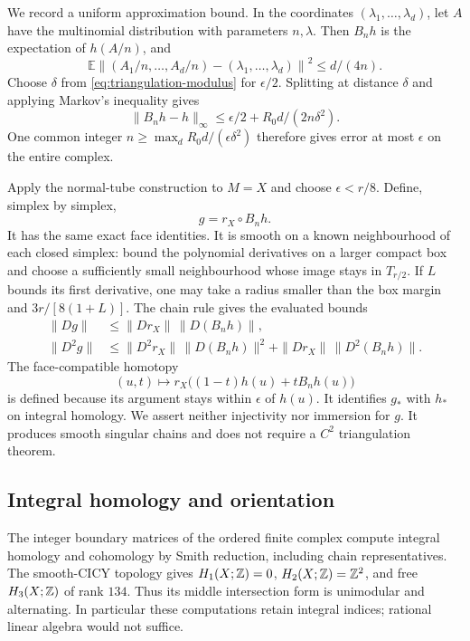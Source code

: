 We record a uniform approximation bound. In the coordinates
$(\lambda_1,\ldots,\lambda_d)$, let $A$ have the multinomial
distribution with parameters $n,\lambda$. Then $B_nh$ is the
expectation of $h(A/n)$, and
\[
 \mathbb E\left\|(A_1/n,\ldots,A_d/n)
                    -(\lambda_1,\ldots,\lambda_d)\right\|^2
                      \le d/(4n).
\]
Choose $\delta$ from \eqref{eq:triangulation-modulus} for
$\epsilon/2$. Splitting at distance $\delta$ and applying
Markov's inequality gives
\begin{equation}\label{eq:bernstein-bound}
       \|B_nh-h\|_\infty\le\epsilon/2
                           +R_0d/(2n\delta^2).
\end{equation}
One common integer $n\ge\max_d R_0d/(\epsilon\delta^2)$
therefore gives error at most $\epsilon$ on the entire complex.

Apply the normal-tube construction to $M=X$ and choose
$\epsilon<r/8$. Define, simplex by simplex,
\begin{equation}\label{eq:smooth-simplex-map}
                         g=r_X\circ B_nh.
\end{equation}
It has the same exact face identities. It is smooth on a known
neighbourhood of each closed simplex: bound the polynomial derivatives
on a larger compact box and choose a sufficiently small neighbourhood
whose image stays in $T_{r/2}$. If $L$ bounds its first derivative,
one may take a radius smaller than the box margin and
$3r/[8(1+L)]$. The chain rule gives the evaluated bounds
\begin{equation}\label{eq:smoothed-chain-derivatives}
 \begin{split}
 \|Dg\|&\le\|Dr_X\|\,\|D(B_nh)\|,\\
 \|D^2g\|&\le\|D^2r_X\|\,\|D(B_nh)\|^2
                       +\|Dr_X\|\,\|D^2(B_nh)\|.
 \end{split}
\end{equation}
The face-compatible homotopy
\[
 (u,t)\longmapsto r_X\bigl((1-t)h(u)+tB_nh(u)\bigr)
\]
is defined because its argument stays within $\epsilon$ of $h(u)$.
It identifies $g_*$ with $h_*$ on integral homology. We assert
neither injectivity nor immersion for $g$. It produces smooth
singular chains and does not require a $C^2$ triangulation theorem.

\subsection{Integral homology and orientation}

The integer boundary matrices of the ordered finite complex compute
integral homology and cohomology by Smith reduction, including chain
representatives. The smooth-CICY topology gives
$H_1(X;\mathbb Z)=0$, $H_2(X;\mathbb Z)=\mathbb Z^2$, and free
$H_3(X;\mathbb Z)$ of rank $134$. Thus its middle intersection form is
unimodular and alternating. In particular these computations retain
integral indices; rational linear algebra would not suffice.

